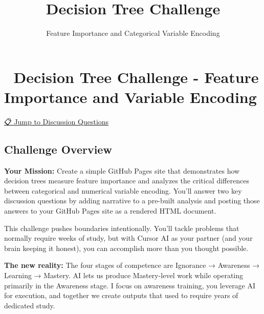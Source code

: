 \documentclass[
  letterpaper,
  DIV=11,
  numbers=noendperiod]{scrartcl}
\title{Decision Tree Challenge}
\subtitle{Feature Importance and Categorical Variable Encoding}
\author{}
\date{}
\begin{document}
\maketitle


\section{🌳 Decision Tree Challenge - Feature Importance and Variable
Encoding}\label{decision-tree-challenge---feature-importance-and-variable-encoding}

\hyperref[discussion-questions-for-challenge]{📋 Jump to Discussion
Questions}

\subsection{Challenge Overview}\label{challenge-overview}

\textbf{Your Mission:} Create a simple GitHub Pages site that
demonstrates how decision trees measure feature importance and analyzes
the critical differences between categorical and numerical variable
encoding. You'll answer two key discussion questions by adding narrative
to a pre-built analysis and posting those answers to your GitHub Pages
site as a rendered HTML document.

\begin{tcolorbox}[enhanced jigsaw, colbacktitle=quarto-callout-warning-color!10!white, toptitle=1mm, colframe=quarto-callout-warning-color-frame, breakable, rightrule=.15mm, arc=.35mm, bottomtitle=1mm, titlerule=0mm, opacityback=0, title=\textcolor{quarto-callout-warning-color}{\faExclamationTriangle}\hspace{0.5em}{⚠️ AI Partnership Required}, colback=white, bottomrule=.15mm, toprule=.15mm, leftrule=.75mm, coltitle=black, opacitybacktitle=0.6, left=2mm]

This challenge pushes boundaries intentionally. You'll tackle problems
that normally require weeks of study, but with Cursor AI as your partner
(and your brain keeping it honest), you can accomplish more than you
thought possible.

\textbf{The new reality:} The four stages of competence are Ignorance →
Awareness → Learning → Mastery. AI lets us produce Mastery-level work
while operating primarily in the Awareness stage. I focus on awareness
training, you leverage AI for execution, and together we create outputs
that used to require years of dedicated study.

\end{tcolorbox}
\end{document}
